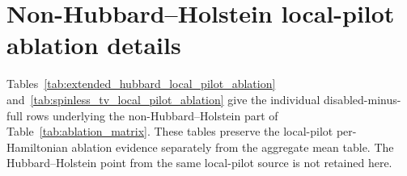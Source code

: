 \documentclass[
  reprint,
  amsmath,
  amssymb,
  aps,
  pra,
  nofootinbib,
  superscriptaddress,
  floatfix
]{revtex4-2}
\begin{document}
\section{Non-Hubbard--Holstein local-pilot ablation details}
\label{app:local_pilot_ablation_details}

Tables~\ref{tab:extended_hubbard_local_pilot_ablation}
and~\ref{tab:spinless_tv_local_pilot_ablation} give the individual
disabled-minus-full rows underlying the non-Hubbard--Holstein part of
Table~\ref{tab:ablation_matrix}.  These tables preserve the local-pilot
per-Hamiltonian ablation evidence separately from the aggregate mean table.  The
Hubbard--Holstein point from the same local-pilot source is not retained here.
\end{document}
